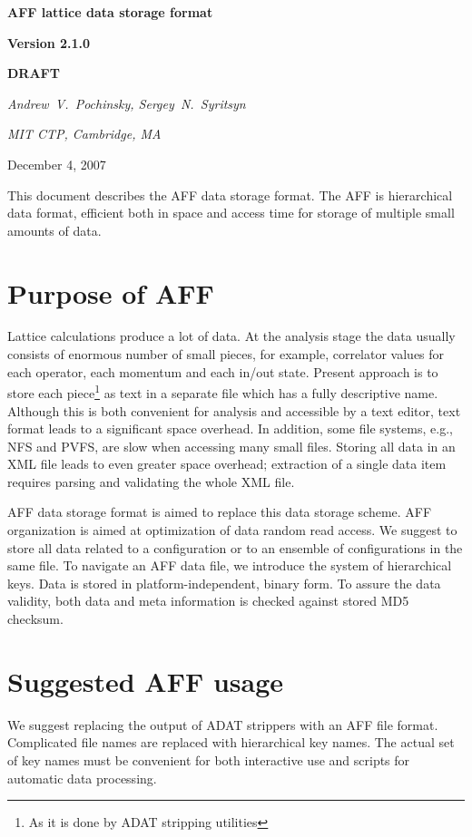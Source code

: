 \documentclass[10pt,letterpaper]{article}
\begin{document}
\centerline{\huge\bf AFF lattice data storage format}
\vspace{15pt}
\centerline{\huge\bf Version 2.1.0}
\vspace{15pt}
\centerline{\Huge\bf DRAFT}
\vspace{20pt}
\centerline{\it Andrew~V.~Pochinsky, Sergey~N.~Syritsyn}
\centerline{\it MIT CTP, Cambridge, MA}
\vspace{10pt}
\centerline{December 4, 2007}
\vspace{20pt}

\noindent This document describes the AFF data storage format. 
The AFF is hierarchical data format, efficient both in space and access time 
for storage of multiple small amounts of data.

\tableofcontents

\section{Purpose of AFF}
Lattice calculations produce a lot of data. 
At the analysis stage the data usually consists of enormous number of small
pieces, for example, correlator values for
each operator, each momentum and each in/out state.
Present approach is to store each
piece\footnote{As it is done by ADAT stripping utilities}
as text in a separate file which has a fully descriptive name. 
Although this is both convenient for analysis and accessible by a text editor,
text format leads to a significant space overhead. 
In addition, some file systems, e.g., NFS and PVFS, are slow when accessing
many small files. 
Storing all data in an XML file leads to even greater space overhead;
extraction of a single data item requires parsing and validating the
whole XML file.

AFF data storage format is aimed to replace this data storage scheme. 
AFF organization is aimed at optimization of data random read access.
We suggest to store all data related to a configuration or to an ensemble of configurations in
the same file.
To navigate an AFF data file, we introduce the system of hierarchical keys.
Data is stored in platform-independent, binary form.
To assure the data validity, both data and meta information is checked against stored
MD5 checksum.


\section{Suggested AFF usage}

We suggest replacing the output of ADAT strippers with an AFF file format. 
Complicated file names are replaced with hierarchical key names. 
The actual set of key names must be convenient for both interactive use and 
scripts for automatic data processing.
\end{document}
